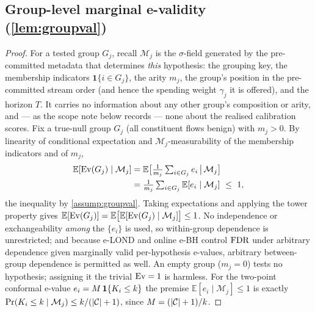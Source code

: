 
\subsection{Group-level marginal e-validity (\cref{lem:groupval})}

\begin{proof}
For a tested group $G_j$, recall $\mathcal{M}_j$ is the $\sigma$-field generated by the pre-committed
metadata that determines \emph{this} hypothesis: the grouping key, the membership indicators
$\mathbf 1\{i\in G_j\}$, the arity $m_j$, the group's position in the pre-committed stream order (and
hence the spending weight $\gamma_j$ it is offered), and the horizon $T$. It carries no information
about any other group's composition or arity, and --- as the scope note below records --- none about
the realised calibration scores. Fix a true-null group $G_j$ (all constituent flows benign) with
$m_j>0$. By linearity of conditional expectation and $\mathcal{M}_j$-measurability of the membership
indicators and of $m_j$,
\begin{align*}
\mathbb{E}[\mathrm{Ev}(G_j)\mid\mathcal{M}_j]
 &=\mathbb{E}\big[\tfrac1{m_j}\textstyle\sum_{i\in G_j} e_i \,\big|\,\mathcal{M}_j\big]\\
 &=\tfrac1{m_j}\textstyle\sum_{i\in G_j}\mathbb{E}[e_i\mid\mathcal{M}_j]\ \le\ 1,
\end{align*}
the inequality by \cref{assump:groupval}. Taking expectations and applying the tower property gives
$\mathbb{E}[\mathrm{Ev}(G_j)]=\mathbb{E}\big[\mathbb{E}[\mathrm{Ev}(G_j)\mid\mathcal{M}_j]\big]\le1$. No independence or
exchangeability \emph{among} the $\{e_i\}$ is used, so within-group dependence is unrestricted; and
because e-LOND and online e-BH control $\mathrm{FDR}$ under arbitrary dependence given marginally valid
per-hypothesis e-values, arbitrary between-group dependence is permitted as well. An empty group
($m_j=0$) tests no hypothesis; assigning it the trivial $\mathrm{Ev}=1$ is harmless. For the two-point
conformal e-value $e_i=M\,\mathbf 1\{K_i\le k\}$ the premise $\mathbb{E}[e_i\mid\mathcal{M}_j]\le1$
is exactly $\Pr(K_i\le k\mid\mathcal{M}_j)\le k/(\lvert\mathcal{C}\rvert+1)$, since $M=(\lvert\mathcal{C}\rvert+1)/k$.
\end{proof}

